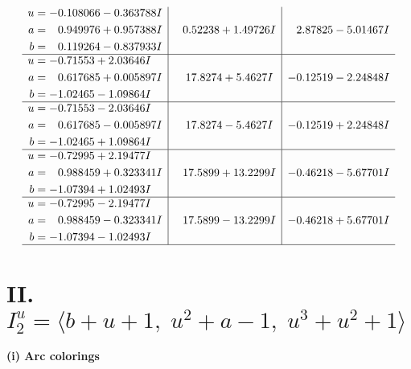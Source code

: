 \documentclass[1p]{elsarticle_modified}
\theoremstyle{definition}
\begin{document}
$$\begin{array}{c|c|c}
\begin{aligned}
u &= -0.108066 - 0.363788 I \\
a &= \phantom{-}0.949976 + 0.957388 I \\
b &= \phantom{-}0.119264 - 0.837933 I\end{aligned}
 & \phantom{-}0.52238 + 1.49726 I & \phantom{-}2.87825 - 5.01467 I \\ \hline\begin{aligned}
u &= -0.71553 + 2.03646 I \\
a &= \phantom{-}0.617685 + 0.005897 I \\
b &= -1.02465 - 1.09864 I\end{aligned}
 & \phantom{-}17.8274 + 5.4627 I & -0.12519 - 2.24848 I \\ \hline\begin{aligned}
u &= -0.71553 - 2.03646 I \\
a &= \phantom{-}0.617685 - 0.005897 I \\
b &= -1.02465 + 1.09864 I\end{aligned}
 & \phantom{-}17.8274 - 5.4627 I & -0.12519 + 2.24848 I \\ \hline\begin{aligned}
u &= -0.72995 + 2.19477 I \\
a &= \phantom{-}0.988459 + 0.323341 I \\
b &= -1.07394 + 1.02493 I\end{aligned}
 & \phantom{-}17.5899 + 13.2299 I & -0.46218 - 5.67701 I \\ \hline\begin{aligned}
u &= -0.72995 - 2.19477 I \\
a &= \phantom{-}0.988459 - 0.323341 I \\
b &= -1.07394 - 1.02493 I\end{aligned}
 & \phantom{-}17.5899 - 13.2299 I & -0.46218 + 5.67701 I\\
 \hline 
 \end{array}$$\newpage\newpage\renewcommand{\arraystretch}{1}
\centering \section*{II. $I^u_{2}= \langle b+u+1,\;u^2+a-1,\;u^3+u^2+1 \rangle$}
\flushleft \textbf{(i) Arc colorings}\\
\end{document}
